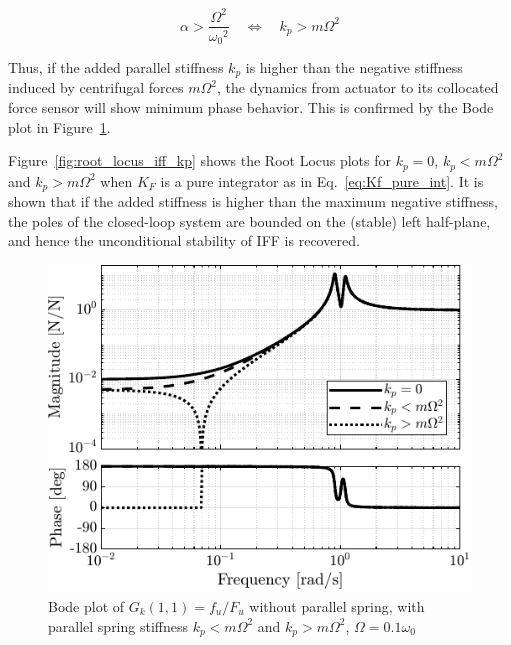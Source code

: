 \documentclass[10pt]{iopart}
\begin{document}
\begin{equation}
\label{eq:kp_cond_cc_zeros}
  \alpha > \frac{\Omega^2}{{\omega_0}^2} \quad \Leftrightarrow \quad k_p > m \Omega^2
\end{equation}

Thus, if the added parallel stiffness \(k_p\) is higher than the negative stiffness induced by centrifugal forces \(m \Omega^2\), the dynamics from actuator to its collocated force sensor will show minimum phase behavior.
This is confirmed by the Bode plot in Figure~\ref{fig:plant_iff_kp}.

Figure~\ref{fig:root_locus_iff_kp} shows the Root Locus plots for \(k_p = 0\), \(k_p < m \Omega^2\) and \(k_p > m \Omega^2\) when \(K_F\) is a pure integrator as in Eq.~\eqref{eq:Kf_pure_int}.
It is shown that if the added stiffness is higher than the maximum negative stiffness, the poles of the closed-loop system are bounded on the (stable) left half-plane, and hence the unconditional stability of IFF is recovered.

\begin{figure}[htbp]
\centering
\includegraphics[scale=1,scale=0.95]{figs/fig13.pdf}
\caption{\label{fig:plant_iff_kp}Bode plot of \(G_{k}(1,1) = f_u/F_u\) without parallel spring, with parallel spring stiffness \(k_p < m \Omega^2\) and \(k_p > m \Omega^2\), \(\Omega = 0.1 \omega_0\)}
\end{figure}
\end{document}

